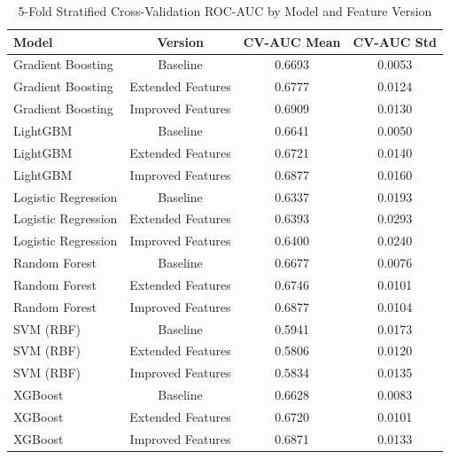 \begin{table}[htbp]
\caption{5-Fold Stratified Cross-Validation ROC-AUC by Model and Feature Version}
\label{tab:cv_performance}
\begin{tabular}{lccc}
\toprule

Model & Version & CV-AUC Mean & CV-AUC Std \\
\midrule

Gradient Boosting & Baseline & 0.6693 & 0.0053 \\
Gradient Boosting & Extended Features & 0.6777 & 0.0124 \\
Gradient Boosting & Improved Features & 0.6909 & 0.0130 \\
LightGBM & Baseline & 0.6641 & 0.0050 \\
LightGBM & Extended Features & 0.6721 & 0.0140 \\
LightGBM & Improved Features & 0.6877 & 0.0160 \\
Logistic Regression & Baseline & 0.6337 & 0.0193 \\
Logistic Regression & Extended Features & 0.6393 & 0.0293 \\
Logistic Regression & Improved Features & 0.6400 & 0.0240 \\
Random Forest & Baseline & 0.6677 & 0.0076 \\
Random Forest & Extended Features & 0.6746 & 0.0101 \\
Random Forest & Improved Features & 0.6877 & 0.0104 \\
SVM (RBF) & Baseline & 0.5941 & 0.0173 \\
SVM (RBF) & Extended Features & 0.5806 & 0.0120 \\
SVM (RBF) & Improved Features & 0.5834 & 0.0135 \\
XGBoost & Baseline & 0.6628 & 0.0083 \\
XGBoost & Extended Features & 0.6720 & 0.0101 \\
XGBoost & Improved Features & 0.6871 & 0.0133 \\
\bottomrule

\end{tabular}
\end{table}
